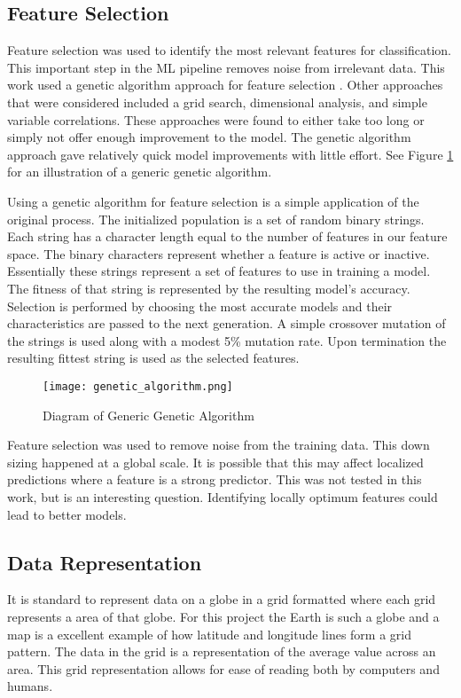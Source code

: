 \subsection{Feature Selection}
Feature selection was used to identify the most relevant features for classification.
This important step in the \ac{ML} pipeline removes noise from irrelevant data.
This work used a genetic algorithm approach for feature selection \cite{yang1998feature}.
Other approaches that were considered included a grid search, dimensional analysis, and simple variable correlations.
These approaches were found to either take too long or simply not offer enough improvement to the model.
The genetic algorithm approach gave relatively quick model improvements with little effort.
See Figure \ref{fig:GA} for an illustration of a generic genetic algorithm.

\par
Using a genetic algorithm for feature selection is a simple application of the original process.
The initialized population is a set of random binary strings.
Each string has a character length equal to the number of features in our feature space.
The binary characters represent whether a feature is active or inactive.
Essentially these strings represent a set of features to use in training a model.
The fitness of that string is represented by the resulting model's accuracy.
Selection is performed by choosing the most accurate models and their characteristics are passed to the next generation.
A simple crossover mutation of the strings is used along with a modest 5\% mutation rate.
Upon termination the resulting fittest string is used as the selected features.


\begin{figure}[htp]
    \centering
    \caption{Diagram of Generic Genetic Algorithm}
    \label{fig:GA}
    \texttt{[image: genetic\_algorithm.png]}
\end{figure}

\par
Feature selection was used to remove noise from the training data.
This down sizing happened at a global scale.
It is possible that this may affect localized predictions where a feature is a strong predictor.
This was not tested in this work, but is an interesting question.
Identifying locally optimum features could lead to better models.


\subsection{Data Representation}
It is standard to represent data on a globe in a grid formatted where each grid represents a area of that globe.
For this project the Earth is such a globe and a map is a excellent example of how latitude and longitude lines form a grid pattern.
The data in the grid is a representation of the average value across an area.
This grid representation allows for ease of reading both by computers and humans.


